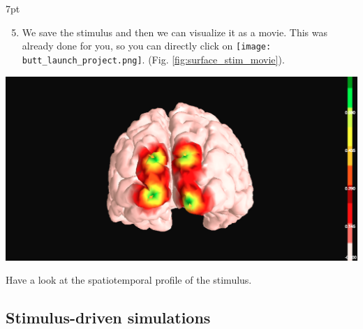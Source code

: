 \documentclass{tufte-handout}
\newenvironment{formal}{%
  \def\FrameCommand{%
    \hspace{1pt}%
    {\color{DarkBlue}\vrule width 2pt}%
    {\color{formalshade}\vrule width 4pt}%
    \colorbox{formalshade}%
  }%
  \MakeFramed{\advance\hsize-\width\FrameRestore}%
  \noindent\hspace{-4.55pt}%
  \begin{adjustwidth}{}{7pt}%
  \vspace{2pt}\vspace{2pt}%
}
{%
  \vspace{2pt}\end{adjustwidth}\endMakeFramed%
}
\begin{document}
\begin{formal}
\begin{enumerate}
\setcounter{enumi}{4}
\item We save the stimulus and then we can visualize it as a movie. This was already done for you, so you can directly click on \texttt{[image: butt\_launch\_project.png]}. (Fig. \ref{fig:surface_stim_movie}).
\end{enumerate}
\end{formal}
 
 \begin{marginfigure}
  \includegraphics[width=\linewidth]{Handout_UI_HeterogenousModelAndStimulation_StimulusSurfaceMovie}%
  \caption{Have a look at the spatiotemporal profile of the stimulus.}%
  \label{fig:surface_stim_movie}%
\end{marginfigure}


\subsection{Stimulus-driven simulations}\label{sec:stim_sim}
\end{document}
